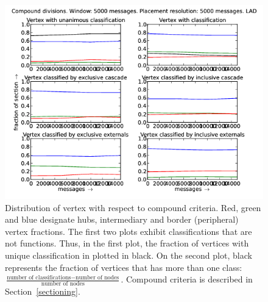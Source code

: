 \documentclass[%
 aip,
 jmp,%
 amsmath,amssymb,
 reprint,%
]{revtex4-1}
\begin{document}
\begin{figure}[hbtp] 
   \centering
        \includegraphics[width=\textwidth]{figs/LAD/5000_2}
    \caption{Distribution of vertex with respect to compound criteria. Red, green and blue designate hubs, intermediary and border (peripheral) vertex fractions. The first two plots exhibit classifications that are not functions. Thus, in the first plot, the fraction of vertices with unique classification in plotted in black. On the second plot, black represents the fraction of vertices that has more than one class: $\frac{\text{number of classifications} - \text{number of nodes}}{\text{number of nodes}}$. Compound criteria is described in Section~\ref{sectioning}.}
    \label{fig:lad5000_}
\end{figure}
\end{document}
